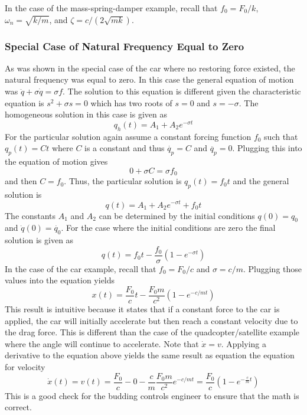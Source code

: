 In the case of the mass-spring-damper example, recall that $f_0=F_0/k$, $\omega_n = \sqrt{k/m}$, and $\zeta = c/(2\sqrt{mk})$.

\subsubsection{Special Case of Natural Frequency Equal to Zero}

As was shown in the special case of the car where no restoring force existed, the natural frequency was equal to zero. In this case the general equation of motion was $\ddot{q} + \sigma \dot{q} = \sigma f$. The solution to this equation is different given the characteristic equation is $s^2+\sigma s=0$ which has two roots of $s=0$ and $s=-\sigma$. The homogeneous solution in this case is given as 
\begin{equation}
    q_h(t) = A_1 + A_2 e^{-\sigma t}
\end{equation}
For the particular solution again assume a constant forcing function $f_0$ such that $q_p(t)=C t$ where $C$ is a constant and thus $\dot{q_p}=C$ and $\ddot{q_p}=0$. Plugging this into the equation of motion gives
\begin{equation}
    0 + \sigma C = \sigma f_0
\end{equation}
and then $C = f_0$. Thus, the particular solution is $q_p(t)=f_0 t$ and the general solution is
\begin{equation}
    q(t) = A_1 + A_2 e^{-\sigma t} + f_0 t
\end{equation} 
The constants $A_1$ and $A_2$ can be determined by the initial conditions $q(0)=q_0$ and $\dot{q}(0)=\dot{q_0}$. For the case where the initial conditions are zero the final solution is given as 
\begin{equation}
    q(t) = f_0 t - \frac{f_0}{\sigma} (1 - e^{-\sigma t})
\end{equation}
In the case of the car example, recall that $f_0 = F_0/c$ and $\sigma = c/m$. Plugging those values into the equation yields 
\begin{equation}
    x(t) = \frac{F_0}{c} t - \frac{F_0 m}{c^2} (1 - e^{-c/m t})
\end{equation}
This result is intuitive because it states that if a constant force to the car is applied, the car will initially accelerate but then reach a constant velocity due to the drag force. This is different than the case of the quadcopter/satellite example where the angle will continue to accelerate. Note that $\dot{x} = v$. Applying a derivative to the equation above yields the same result as equation the equation for velocity
\begin{equation}\label{e:position_car_solution}
    \dot{x}(t) = v(t) = \frac{F_0}{c} - 0 - \frac{c}{m}\frac{F_0 m}{c^2} e^{-c/m t} = \frac{F_0}{c}\left(1 - e^{-\frac{c}{m}t}\right)
\end{equation}
This is a good check for the budding controls engineer to ensure that the math is correct. 

